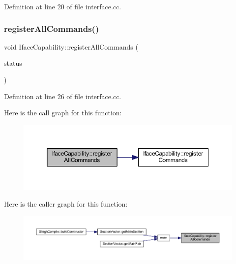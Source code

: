 Definition at line 20 of file interface.\+cc.

\mbox{\label{class_iface_capability_a0585d08799177d081f703f09e2ab18e4}} 
\subsubsection{\texorpdfstring{registerAllCommands()}{registerAllCommands()}}
{\footnotesize\ttfamily void Iface\+Capability\+::register\+All\+Commands (\begin{DoxyParamCaption}\item[{\mbox{\hyperlink{class_iface_status}{Iface\+Status}} $\ast$}]{status }\end{DoxyParamCaption})\hspace{0.3cm}{\ttfamily [static]}}



Definition at line 26 of file interface.\+cc.

Here is the call graph for this function\+:
\nopagebreak
\begin{figure}[H]
\begin{center}
\leavevmode
\includegraphics[width=350pt]{class_iface_capability_a0585d08799177d081f703f09e2ab18e4_cgraph}
\end{center}
\end{figure}
Here is the caller graph for this function\+:
\nopagebreak
\begin{figure}[H]
\begin{center}
\leavevmode
\includegraphics[width=350pt]{class_iface_capability_a0585d08799177d081f703f09e2ab18e4_icgraph}
\end{center}
\end{figure}
\mbox{\label{class_iface_capability_a8ed0987e781e5213db777be93e85af6e}} 
